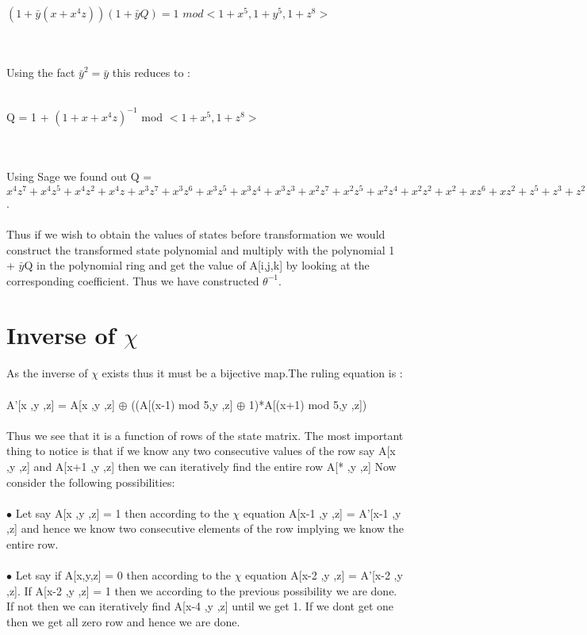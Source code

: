\documentclass[12 pt,a4paper]{article}
\begin{document}
\centerline{$ (1 + \bar{y}(x + x^4z))(1 + \bar{y}Q) = 1$ $ mod <1 + x^5,1 + y^5,1 + z^8>  $}
\\\\Using the fact $\bar{y}^2 = \bar{y}$ this reduces to :\\\\
\centerline{ Q = 1 + $(1 + x + x^4z)^{-1}$ mod $<1 + x^5, 1 + z^8>$ }
\\\\ Using Sage we found out Q = $x^4z^7 + x^4z^5 + x^4z^2 + x^4z + x^3z^7 + x^3z^6 + x^3z^5 + x^3z^4 + x^3z^3 + x^2z^7 + x^2z^5 + x^2z^4 + x^2z^2 + x^2 + xz^6 + xz^2 + z^5 + z^3 + z^2 + z + 1$.
\\\\ Thus if we wish to obtain the values of states before transformation we would construct the transformed state polynomial and multiply with the polynomial 1 + $\bar{y}$Q in the polynomial ring and get the value of A[i,j,k] by looking at the corresponding coefficient. Thus we have constructed $\theta^{-1}$.

\section{Inverse of $\chi$}
As the inverse of $\chi$ exists thus it must be a bijective map.The ruling equation is :
\\\\ A'[x ,y ,z] = A[x ,y ,z] $\oplus$ ((A[(x-1) mod 5,y ,z] $\oplus$ 1)*A[(x+1) mod 5,y ,z])
\\\\Thus we see that it is a function of rows of the state matrix. The most important thing to notice is that if we know any two consecutive values of the row say A[x ,y ,z] and A[x+1 ,y ,z] then we can iteratively find the entire row A[* ,y ,z]
Now consider the following possibilities:\\\\
$\bullet$ Let say A[x ,y ,z] = 1 then according to the $\chi$ equation A[x-1 ,y ,z] = A'[x-1 ,y ,z] and hence we know two consecutive elements of the row implying we know the entire row. \\\\
$\bullet$ Let say if A[x,y,z] = 0 then according to the $\chi$ equation A[x-2 ,y ,z] = A'[x-2 ,y ,z]. If A[x-2 ,y ,z] = 1 then we according to the previous possibility we are done. If not then we can iteratively find A[x-4 ,y ,z] until we get 1. If we dont get one then we get all zero row and hence we are done.
\end{document}
